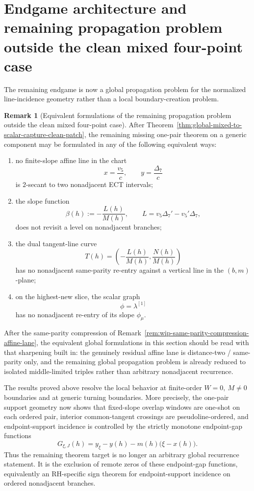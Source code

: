 \documentclass[11pt,a4paper]{amsart}
\theoremstyle{plain}
\theoremstyle{definition}
\newtheorem{remark}[theorem]{Remark}
\begin{document}
\section{Endgame architecture and remaining propagation problem outside the clean mixed four-point case}

The remaining endgame is now a global propagation problem for the normalized
line-incidence geometry rather than a local boundary-creation problem.

\begin{remark}[Equivalent formulations of the remaining propagation problem outside the clean mixed four-point case]
\label{rem:equivalent-global-propagation-problem}
After Theorem~\ref{thm:global-mixed-to-scalar-capture-clean-patch}, the
remaining missing one-pair theorem on a generic component may be formulated in
any of the following equivalent ways:
\begin{enumerate}
\item no finite-slope affine line in the chart
\[
x=\frac{v_5}{c},
\qquad
y=\frac{\Delta_7}{c}
\]
is $2$-secant to two nonadjacent ECT intervals;

\item the slope function
\[
\beta(h):=-\frac{L(h)}{M(h)},
\qquad
L=v_5\Delta_7'-v_5'\Delta_7,
\]
does not revisit a level on nonadjacent branches;

\item the dual tangent-line curve
\[
T(h)=\left(-\frac{L(h)}{M(h)},\frac{N(h)}{M(h)}\right)
\]
has no nonadjacent same-parity re-entry against a vertical line in the
$(b,m)$-plane;

\item on the highest-new slice, the scalar graph
\[
\phi=\lambda^{[1]}
\]
has no nonadjacent re-entry of its slope $\phi_\mu$.
\end{enumerate}
After the same-parity compression of
Remark~\ref{rem:wip-same-parity-compression-affine-lane}, the equivalent
global formulations in this section should be read with that sharpening built
in: the genuinely residual affine lane is distance-two / same-parity only, and
the remaining global propagation problem is already reduced to isolated
middle-limited triples rather than arbitrary nonadjacent recurrence.

The results proved above resolve the local behavior at finite-order
$W=0,\ M\neq 0$ boundaries and at generic turning boundaries. More precisely,
the one-pair support geometry now shows that fixed-slope overlap windows are
one-shot on each ordered pair, interior common-tangent crossings are
pseudoline-ordered, and endpoint-support incidence is controlled by the
strictly monotone endpoint-gap functions
\[
G_{\xi,J}(h)=y_\xi-y(h)-m(h)\bigl(\xi-x(h)\bigr).
\]
Thus the remaining theorem target is no longer an arbitrary global recurrence
statement. It is the exclusion of remote zeros of these endpoint-gap functions,
equivalently an RH-specific sign theorem for endpoint-support incidence on
ordered nonadjacent branches.
\end{remark}
\end{document}

